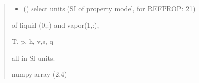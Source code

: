 \documentclass[letterpaper,10pt,english]{sphinxmanual}
\begin{document}
\begin{fulllineitems}
\begin{quote}
\begin{description}
\begin{itemize}
\item {} 
\sphinxAtStartPar
{} () \textendash{} select units (SI of property model, for REFPROP: 21)

\end{itemize}

\sphinxAtStartPar

\sphinxAtStartPar
{} \textendash{}
\begin{description}
\sphinxAtStartPar
of liquid (0,:) and vapor(1,:),

\end{description}

\sphinxAtStartPar
T, p, h, v,s, q

\sphinxAtStartPar
all in SI units.


\sphinxAtStartPar
numpy array (2,4)

\end{description}\end{quote}

\end{fulllineitems}

\end{document}
